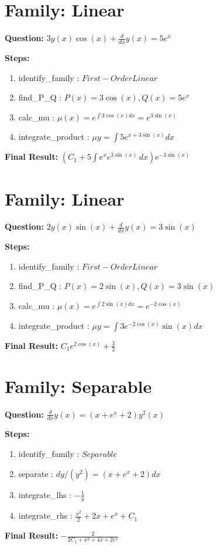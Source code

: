 \documentclass{article}
\begin{document}
\section*{Family: Linear}
\textbf{Question:} $3 y{\left(x \right)} \cos{\left(x \right)} + \frac{d}{d x} y{\left(x \right)} = 5 e^{x}$

\textbf{Steps:}
\begin{enumerate}
\item identify_family :  $First-Order Linear$
\item find_P_Q :  $P(x)=3 \cos{\left(x \right)}, Q(x)=5 e^{x}$
\item calc_mu :  $\mu(x) = e^{\int 3 \cos{\left(x \right)} dx} = e^{3 \sin{\left(x \right)}}$
\item integrate_product :  $\mu y = \int 5 e^{x + 3 \sin{\left(x \right)}} dx$
\end{enumerate}
\textbf{Final Result:} $\left(C_{1} + 5 \int e^{x} e^{3 \sin{\left(x \right)}}\, dx\right) e^{- 3 \sin{\left(x \right)}}$

\section*{Family: Linear}
\textbf{Question:} $2 y{\left(x \right)} \sin{\left(x \right)} + \frac{d}{d x} y{\left(x \right)} = 3 \sin{\left(x \right)}$

\textbf{Steps:}
\begin{enumerate}
\item identify_family :  $First-Order Linear$
\item find_P_Q :  $P(x)=2 \sin{\left(x \right)}, Q(x)=3 \sin{\left(x \right)}$
\item calc_mu :  $\mu(x) = e^{\int 2 \sin{\left(x \right)} dx} = e^{- 2 \cos{\left(x \right)}}$
\item integrate_product :  $\mu y = \int 3 e^{- 2 \cos{\left(x \right)}} \sin{\left(x \right)} dx$
\end{enumerate}
\textbf{Final Result:} $C_{1} e^{2 \cos{\left(x \right)}} + \frac{3}{2}$

\section*{Family: Separable}
\textbf{Question:} $\frac{d}{d x} y{\left(x \right)} = \left(x + e^{x} + 2\right) y^{2}{\left(x \right)}$

\textbf{Steps:}
\begin{enumerate}
\item identify_family :  $Separable$
\item separate :  $dy / (y^{2}) = (x + e^{x} + 2) dx$
\item integrate_lhs :  $- \frac{1}{y}$
\item integrate_rhs :  $\frac{x^{2}}{2} + 2 x + e^{x} + C_1$
\end{enumerate}
\textbf{Final Result:} $- \frac{2}{2 C_{1} + x^{2} + 4 x + 2 e^{x}}$
\end{document}
